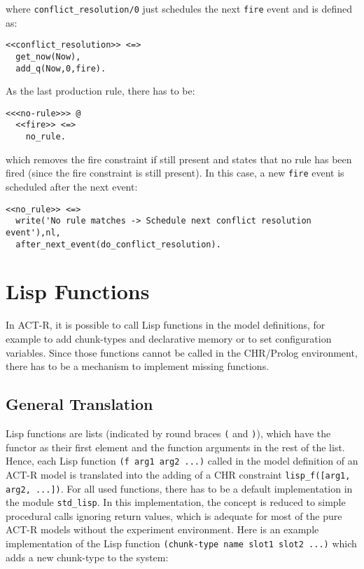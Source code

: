 where \lstinline|conflict_resolution/0| just schedules the next \lstinline|fire| event and is defined as:

\begin{lstlisting}
<<conflict_resolution>> <=> 
  get_now(Now),
  add_q(Now,0,fire).
\end{lstlisting}

As the last production rule, there has to be:

\begin{lstlisting}
<<<no-rule>>> @ 
  <<fire>> <=> 
    no_rule.
\end{lstlisting}

which removes the fire constraint if still present and states that no rule has been fired (since the fire constraint is still present). In this case, a new \lstinline|fire| event is scheduled after the next event:

\begin{lstlisting}
<<no_rule>> <=> 
  write('No rule matches -> Schedule next conflict resolution event'),nl,
  after_next_event(do_conflict_resolution).
\end{lstlisting}

\section{Lisp Functions}
\label{lisp_functions}

In ACT-R, it is possible to call Lisp functions in the model definitions, for example to add chunk-types and declarative memory or to set configuration variables. Since those functions cannot be called in the CHR/Prolog environment, there has to be a mechanism to implement missing functions.

\subsection{General Translation}

Lisp functions are lists (indicated by round braces \lstinline|(| and \lstinline|)|), which have the functor as their first element and the function arguments in the rest of the list. Hence, each Lisp function \lstinline|(f arg1 arg2 ...)| called in the model definition of an ACT-R model is translated into the adding of a CHR constraint \lstinline|lisp_f([arg1, arg2, ...])|. For all used functions, there has to be a default implementation in the module \lstinline|std_lisp|. In this implementation, the concept is reduced to simple procedural calls ignoring return values, which is adequate for most of the pure ACT-R models without the experiment environment. Here is an example implementation of the Lisp function \lstinline|(chunk-type name slot1 slot2 ...)| which adds a new chunk-type to the system:

